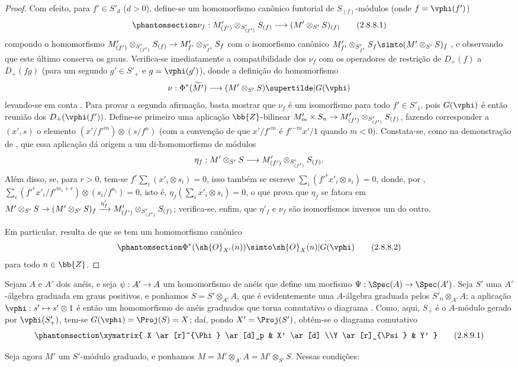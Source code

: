 \documentclass[oneside,10pt]{amsart}
\makeatletter
\newcommand{\ega@arrow}[2]{\mathchoice{#1}{#2}{#2}{#2}}
\let\ega@shortmapsto\mapsto
\renewcommand{\to}{\ega@arrow{\longrightarrow}{\rightarrow}}
\renewcommand{\mapsto}{\ega@arrow{\longmapsto}{\ega@shortmapsto}}
\newcommand{\oldpage}[2][]{\marginnote{\normalfont\footnotesize\textbf{#1}~|~#2}\ignorespaces}
\let\EGAOriginalLabel\label
\renewcommand{\label}[1]{\phantomsection\EGAOriginalLabel{#1}}
\makeatother
\begin{document}
\begin{proof}
Com efeito, para $f'\in S'_d$ ($d>0$), define-se um homomorfismo canônico funtorial de $S_{(f)}$-módulos (onde $f=\vphi(f')$)
\[
\label{II.2.8.8.1}
  \nu_f:M'_{(f')}\otimes_{S'_{(f')}}S_{(f)}\to(M'\otimes_{S'}S)_{(f)}
\tag{2.8.8.1}
\]
compondo o homomorfismo $M'_{(f')}\otimes_{S'_{(f')}}S_{(f)}\to M'_{f'}\otimes_{S'_{f'}}S_f$ com o isomorfismo canônico $M'_{f'}\otimes_{S'_{f'}}S_f\simto(M'\otimes_{S'}S)_f$ , e observando que este último conserva os graus.
Verifica-se imediatamente a compatibilidade dos $\nu_f$ com os operadores de restrição de $D_+(f)$ a $D_+(fg)$ (para um segundo $g'\in S'_+$ e $g=\vphi(g')$), donde a definição do homomorfismo
\[
  \nu:\Phi^*(\widetilde{M'})\to(M'\otimes_{S'}S)\supertilde|G(\vphi)
\]
levando-se em conta .
Para provar a segunda afirmação, basta mostrar que $\nu_f$ é um isomorfismo para todo $f'\in S'_1$, pois $G(\vphi)$ é então reunião dos $D_+(\vphi(f'))$.
Define-se primeiro uma aplicação $\bb{Z}$-bilinear $M'_m\times S_n\to M'_{(f')}\otimes_{S'_{(f')}}S_{(f)}$, fazendo corresponder a $(x',s)$ o elemento $(x'/{f'}^m)\otimes(s/f^n)$ (com a convenção de que $x'/{f'}^m$ é ${f'}^{-m}x'/1$
\oldpage[II]{45}
quando $m<0$).
Constata-se, como na demonstração de , que essa aplicação dá origem a um di-homomorfismo de módulos
\[
  \eta_f: M'\otimes_{S'}S \to M'_{(f')}\otimes_{S'_{(f')}}S_{(f)}.
\]
Além disso, se, para $r>0$, tem-se $f^r\sum_i(x'_i\otimes s_i)=0$, isso também se escreve $\sum_i({f'}^rx'_i\otimes s_i)=0$, donde, por , $\sum_i({f'}^rx'_i/{f'}^{m_i+r})\otimes(s_i/f^{n_i})=0$, isto é, $\eta_f(\sum_i x'_i\otimes s_i)=0$, o que prova que $\eta_f$ se fatora em $M'\otimes_{S'}S\to(M'\otimes_{S'}S)_f\xrightarrow{\eta'_f}M'_{(f')}\otimes_{S'_{(f')}}S_{(f)}$;
verifica-se, enfim, que $\eta'_f$ e $\nu_f$ são isomorfismos inversos um do outro.

Em particular, resulta de  que se tem um homomorfismo canônico
\[
\label{II.2.8.8.2}
  \Phi^*(\sh{O}_{X'}(n)) \simto \sh{O}_X(n)|G(\vphi)
\tag{2.8.8.2}
\]
para todo $n\in\bb{Z}$.
\end{proof}

\begin{env}[2.8.9]
\label{II.2.8.9}
Sejam $A$ e $A'$ dois anéis, e seja $\psi:A'\to A$ um homomorfismo de anéis que define um morfismo $\Psi:\Spec(A)\to\Spec(A')$.
Seja $S'$ uma $A'$-álgebra graduada em graus positivos, e ponhamos $S=S'\otimes_{A'}A$, que é evidentemente uma $A$-álgebra graduada pelos $S'_n\otimes_{A'}A$;
a aplicação $\vphi:s'\mapsto s'\otimes1$ é então um homomorfismo de anéis graduados que torna comutativo o diagrama .
Como, aqui, $S_+$ é o $A$-módulo gerado por $\vphi(S'_+)$, tem-se $G(\vphi)=\Proj(S)=X$;
daí, pondo $X'=\Proj(S')$, obtém-se o diagrama comutativo
\[
\label{II.2.8.9.1}
  \xymatrix{
    X \ar[r]^{\Phi} \ar[d]_p
    & X' \ar[d]
  \\Y \ar[r]_{\Psi}
    & Y'
  }
\tag{2.8.9.1}
\]

Seja agora $M'$ um $S'$-módulo graduado, e ponhamos $M=M'\otimes_{A'}A=M'\otimes_{S'}S$.
Nessas condições:
\end{env}
\end{document}
